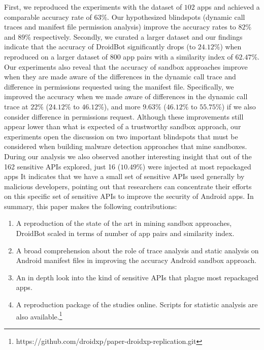 First, we reproduced the experiments with the dataset of $102$ apps and achieved a comparable accuracy rate of $63\%$. Our hypothesized blindspots (dynamic call traces and manifest file permission analysis) improve the accuracy rates to $82\%$ and $89\%$ respectively. Secondly, we curated a larger dataset and our findings indicate that the accuracy of DroidBot significantly drops (to $24.12\%$) when reproduced on a larger dataset of $800$ app pairs with a similarity index of $62.47\%$. Our experiments also reveal that the accuracy of sandbox approaches improve when they are made aware of the differences in the dynamic call trace and difference in permissions requested using the manifest file. Specifically, we improved the accuracy when we made aware of differences in the dynamic call trace at $22\%$ ($24.12\%$ to $46.12\%$), and more $9.63\%$ ($46.12\%$ to $55.75\%$) if we also consider difference in permissions request. Although these improvements still appear lower than what is expected of a trustworthy sandbox approach, our experiments open the discussion on two important blindspots that must be considered when building malware detection approaches that mine sandboxes. %
During our analysis we also observed another interesting insight that out of the 162 sensitive APIs explored, just 16 ($10.49$\%) were injected at most repackaged apps 
It indicates that we have a small set of sensitive APIs used generally by malicious developers, pointing out that researchers can concentrate their efforts on this specific set of sensitive APIs to improve the security of Android apps. 
In summary, this paper makes the following contributions:

\begin{enumerate}[1.]
\item A reproduction of the state of the art in mining sandbox approaches, DroidBot scaled in terms of number of app pairs and similarity index.
\item A broad comprehension about the role of trace analysis and static analysis on Android manifest files in improving the accuracy Android sandbox approach.
\item An in depth look into the kind of sensitive APIs that plague most repackaged apps.
\item A reproduction package of the studies online. Scripts for statistic analysis are also available.\footnote{https://github.com/droidxp/paper-droidxp-replication.git}
\end{enumerate}


